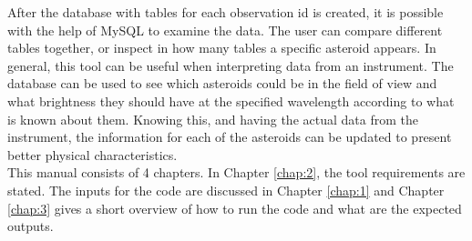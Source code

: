 After the database with tables for each observation id is created, it is possible with the help of MySQL \cite{mysql} to examine the data. The user can compare different tables together, or inspect in how many tables a specific asteroid appears. In general, this tool can be useful when interpreting data from an instrument. The database can be used to see which asteroids could be in the field of view and what brightness they should have at the specified wavelength according to what is known about them. Knowing this, and having the actual data from the instrument, the information for each of the asteroids can be updated to present better physical characteristics. \\

This manual consists of 4 chapters. In Chapter \ref{chap:2}, the tool requirements are stated. The inputs for the code are discussed in Chapter \ref{chap:1} and Chapter \ref{chap:3} gives a short overview of how to run the code and what are the expected outputs. %



